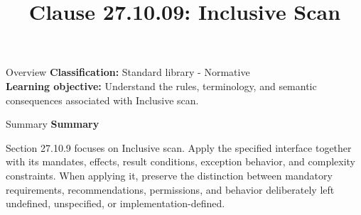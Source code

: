 \documentclass[10pt,letterpaper]{article}
\title{Clause 27.10.09: Inclusive Scan}
\author{}
\date{}
\begin{document}
\maketitle
\begin{CornellOverviewBox}{Overview}
\textbf{Classification:} Standard library - Normative\\[2pt]
\textbf{Learning objective:} Understand the rules, terminology, and semantic consequences associated with Inclusive scan.
\end{CornellOverviewBox}\begin{CornellSummaryBox}{Summary}
{\sffamily\bfseries\color{Accent} Summary}\par\vspace{3pt}Section 27.10.9 focuses on Inclusive scan. Apply the specified interface together with its mandates, effects, result conditions, exception behavior, and complexity constraints. When applying it, preserve the distinction between mandatory requirements, recommendations, permissions, and behavior deliberately left undefined, unspecified, or implementation-defined.
\end{CornellSummaryBox}
\end{document}

